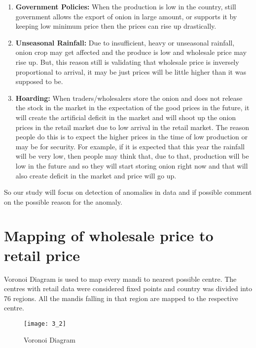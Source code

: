 \begin{enumerate}

\item \textbf{Government Policies:} When the production is low in the country, still government allows the export of onion in large amount, or supports it by keeping low minimum price then the prices can rise up drastically.

\item \textbf{Unseasonal Rainfall:} Due to insufficient, heavy or unseasonal rainfall, onion crop may get affected and the produce is low and wholesale price may rise up. But, this reason still is validating that wholesale price is inversely proportional to arrival, it may be just prices will be little higher than it was supposed to be.

\item \textbf{Hoarding:} When traders/wholesalers store the onion and does not release the stock in the market in the expectation of the good prices in the future, it will create the artificial deficit in the market and will shoot up the onion prices in the retail market due to low arrival in the retail market. The reason people do this is to expect the higher prices in the time of low production or may be for security. For example, if it is expected that this year the rainfall will be very low, then people may think that, due to that, production will be low in the future and so they will start storing onion right now and that will also create deficit in the market and price will go up. 

\end{enumerate}

So our study will focus on detection of anomalies in data and if possible comment on the possible reason for the anomaly.

\section{Mapping of wholesale price to retail price}

Voronoi Diagram is used to map every mandi to nearest possible centre. The centres with retail data were considered fixed points and country was divided into 76 regions. All the mandis falling in that region are mapped to the respective centre.


\begin{figure}[here]
\begin{center}	
\texttt{[image: 3\_2]} 
\caption{Voronoi Diagram}
\label{fig:Voronoi Diagram}
\end{center}
\end{figure}


